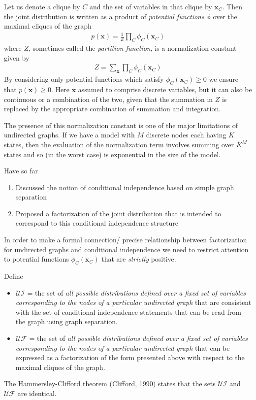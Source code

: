 \documentclass[twoside,english]{uiofysmaster}
\begin{document}
Let us denote a clique by $C$ and the set of variables in that clique by $\bm{x}_C$. Then the joint distribution is written as a product of \textit{potential functions} $\phi$ over the maximal cliques of the graph
\begin{align}
	p(\bm{x}) = \frac{1}{Z} \prod_C \phi_C (\bm{x}_C)
\end{align} 
where $Z$, sometimes called the \textit{partition function}, is a normalization constant given by
\begin{align}
	Z = \sum_{\bm{x}} \prod_C \phi_C (\bm{x}_C)
\end{align}
By considering only potential functions which satisfy $\phi_C (\bm{x}_C) \geq 0$ we ensure that $p(\bm{x}) \geq 0$. Here $\bm{x}$ assumed to comprise discrete variables, but it can also be continuous or a combination of the two, given that the summation in $Z$ is replaced by the appropriate combination of summation and integration.

The presence of this normalization constant is one of the major limitations of undirected graphs. If we have a model with $M$ discrete nodes each having $K$ states, then the evaluation of the normalization term involves summing over $K^M$ states and so (in the worst case) is exponential in the size of the model. 

Have so far
\begin{enumerate}
	\item Discussed the notion of conditional independence based on simple graph separation
	\item Proposed a factorization of the joint distribution that is intended to correspond to this conditional independence structure
\end{enumerate}
In order to make a formal connection/ precise relationship between factorization for undirected graphs and conditional independence we need to restrict attention to potential functions $\phi_C (\bm{x}_C)$ that are \textit{strictly} positive.

Define
\begin{itemize}
	\item $\mathcal{U I}$ = the set of \textit{all possible distributions defined over a fixed set of variables corresponding to the nodes of a particular undirected graph} that are consistent with the set of conditional independence statements that can be read from the graph using graph separation.
	\item $\mathcal{U F}$ = the set of \textit{all possible distributions defined over a fixed set of variables corresponding to the nodes of a particular undirected graph} that can be expressed as a factorization of the form presented above with respect to the maximal cliques of the graph. 
\end{itemize}
The Hammersley-Clifford theorem (Clifford, 1990) states that the sets $\mathcal{U I}$ and $\mathcal{U F}$ are identical.
\end{document}
